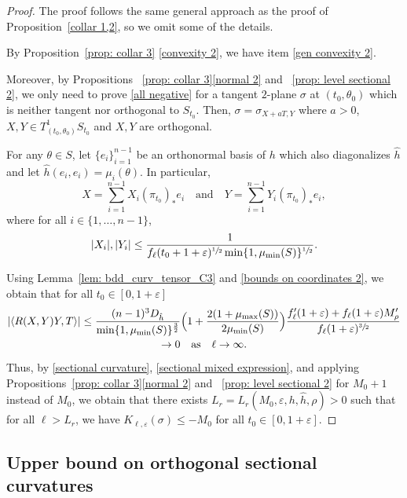 \documentclass[10pt]{amsart}
\theoremstyle{definition}
\let\eps\varepsilon
\renewcommand{\>}{{\rangle}}
\newcommand{\<}{{\langle}}
\let\Subsection\subsection\let\Subsubsection\subsubsection
\begin{document}
\begin{proof}
The proof follows the same general approach as the proof of Proposition~\ref{collar 1,2}, so we omit some of the details.

By Proposition~\ref{prop: collar 3} \eqref{convexity 2}, we have item \eqref{gen convexity 2}.

Moreover, by Propositions ~\ref{prop: collar 3}\eqref{normal 2} and ~\ref{prop: level sectional 2}, we only need to prove \ref{all negative} for a tangent $2$\nobreakdash-plane $\sigma$ at $(t_0,\theta_0)$ which is neither tangent nor orthogonal to $S_{t_0}$. Then, $\sigma=\sigma_{X+aT, Y}$ where $a>0$, $X,Y\in T^1_{(t_0,\theta_0)}S_{t_0}$ and $X,Y$ are orthogonal.

For any $\theta\in S$, let $\{e_i\}_{i=1}^{n-1}$ be an orthonormal basis of $h$ which also diagonalizes $\hat h$ and let $\hat h(e_i,e_i)=\mu_i(\theta)$.
In particular,
\[
X=\sum_{i=1}^{n-1}X_i(\pi_{t_0})_*e_i\quad\text{and}\quad Y=\sum_{i=1}^{n-1}Y_i(\pi_{t_0})_*e_i,
\]
where for all $i\in\{1,\ldots,n-1\}$,
\begin{equation}\label{bounds on coordinates 2}
|X_i|,|Y_i|\leq \frac{1}{f_\ell(t_0+1+\eps)^{\sfrac{1}{2}}\min\{1,\mu_{\min}(S)\}^{\sfrac{1}{2}}}.
\end{equation}

Using Lemma~\ref{lem: bdd_curv_tensor_C3} and \eqref{bounds on coordinates 2}, we obtain that for all $t_0\in[0,1+\eps]$
\begin{multline*}
\left|\langle R(X,Y)Y,T\rangle\right| \leq \frac{(n-1)^3D_{\hat h}}{\min\{1,\mu_{\min}(S)\}^\frac{3}{2}}\Bigl(1+\frac{2(1+\mu_{\max}(S))}{2\mu_{\min}(S)}\Bigr)\frac{f'_\ell(1+\eps)+f_\ell(1+\eps)M'_\rho}{f_\ell(1+\eps)^{\sfrac{3}{2}}}\\
\to 0 \quad \text{as}\quad \ell\to\infty.
\end{multline*}

Thus, by \eqref{sectional curvature}, \eqref{sectional mixed expression}, and applying Propositions~\ref{prop: collar 3}\eqref{normal 2} and ~\ref{prop: level sectional 2} for $M_0+1$ instead of $M_0$, we obtain that there exists $L_r=L_r(M_0, \eps, h, \hat h, \rho)>0$ such that for all $\ell>L_r$, we have $K_{\ell,\eps}(\sigma)\leq -M_0$ for all $t_0\in[0,1+\eps]$.
\end{proof}

\Subsection{Upper bound on orthogonal sectional curvatures}
\end{document}
